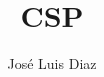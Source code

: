 \documentclass[fleqn]{report}
\title{CSP}
\author{José Luis Diaz}
\date{ }
\begin{document}
 
\maketitle
 
\tableofcontents
 

 



{}

\end{document}
